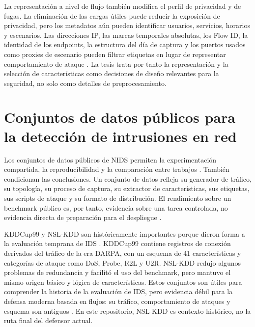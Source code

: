 La representación a nivel de flujo también modifica el perfil de privacidad y de fugas. La eliminación de las cargas útiles puede reducir la exposición de privacidad, pero los metadatos aún pueden identificar usuarios, servicios, horarios y escenarios. Las direcciones IP, las marcas temporales absolutas, los Flow ID, la identidad de los endpoints, la estructura del día de captura y los puertos usados como proxies de escenario pueden filtrar etiquetas en lugar de representar comportamiento de ataque \parencite{Arp2020DosDontsMLSecurity,Kaufman2011LeakageDataMining}. La tesis trata por tanto la representación y la selección de características como decisiones de diseño relevantes para la seguridad, no solo como detalles de preprocesamiento.

\section{Conjuntos de datos públicos para la detección de intrusiones en red}

Los conjuntos de datos públicos de NIDS permiten la experimentación compartida, la reproducibilidad y la comparación entre trabajos \parencite{Ring2019DatasetSurvey,Thakkar2020DatasetsReview,DatasetSurvey2025}. También condicionan las conclusiones. Un conjunto de datos refleja su generador de tráfico, su topología, su proceso de captura, su extractor de características, sus etiquetas, sus scripts de ataque y su formato de distribución. El rendimiento sobre un benchmark público es, por tanto, evidencia sobre una tarea controlada, no evidencia directa de preparación para el despliegue \parencite{Apruzzese2022CrossEvaluationNIDS,Layeghy2023CrossDomainNIDS}.

KDDCup99 y NSL-KDD son históricamente importantes porque dieron forma a la evaluación temprana de IDS \parencite{KDDCup1999,Tavallaee2009NSLKDD}. KDDCup99 contiene registros de conexión derivados del tráfico de la era DARPA, con un esquema de 41 características y categorías de ataque como DoS, Probe, R2L y U2R. NSL-KDD redujo algunos problemas de redundancia y facilitó el uso del benchmark, pero mantuvo el mismo origen básico y lógica de características. Estos conjuntos son útiles para comprender la historia de la evaluación de IDS, pero evidencia débil para la defensa moderna basada en flujos: su tráfico, comportamiento de ataques y esquema son antiguos \parencite{Tavallaee2009NSLKDD,Ring2019DatasetSurvey,Ozgur2016KDDUsage}. En este repositorio, NSL-KDD es contexto histórico, no la ruta final del defensor actual.

